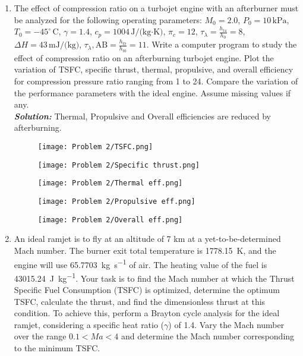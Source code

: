 \documentclass[]{article}
\theoremstyle{definition}
\begin{document}
\begin{enumerate}
\item The effect of compression ratio on a turbojet engine with an afterburner must be analyzed for the following operating parameters:
$ M_0 = 2.0$, $P_0 = 10\, \text{kPa}$, $T_0 = -45^\circ\, \text{C}$, $\gamma = 1.4$, $c_p = 1004\, \text{J/(kg·K)}$, $\pi_c = 12$, $\tau_\lambda = \frac{h_{t4}}{h_0} = 8$, $\Delta H = 43\, \text{mJ/(kg)}$, $\tau_\lambda, \text{AB} = \frac{h_{t7}}{h_{t0}} = 11 $. Write a computer program to study the effect of compression ratio on an afterburning turbojet engine. Plot the variation of TSFC, specific thrust, thermal, propulsive, and overall efficiency for compression pressure ratio ranging from 1 to 24. Compare the variation of the performance parameters with the ideal engine. Assume missing values if any.
\\
\emph{\textbf{Solution:}}
Thermal, Propulsive and Overall efficiencies are reduced by afterburning.
\\
\begin{figure}[htpb]
\texttt{[image: Problem 2/TSFC.png]}
\centering
\end{figure}
\begin{figure}[htpb]
\texttt{[image: Problem 2/Specific thrust.png]}
\centering
\end{figure}
\begin{figure}[htpb]
\texttt{[image: Problem 2/Thermal eff.png]}
\centering
\end{figure}
\begin{figure}[htpb]
\texttt{[image: Problem 2/Propulsive eff.png]}
\centering
\end{figure}
\begin{figure}[htpb]
\texttt{[image: Problem 2/Overall eff.png]}
\centering
\end{figure}

\item 
An ideal ramjet is to fly at an altitude of 7 km at a yet-to-be-determined Mach number. The burner exit total temperature is \SI{1778.15}{\kelvin}, and the engine will use \SI{65.7703}{\kilogram\per\second} of air. The heating value of the fuel is \SI{43015.24}{\joule\per\kilogram}. Your task is to find the Mach number at which the Thrust Specific Fuel Consumption (TSFC) is optimized, determine the optimum TSFC, calculate the thrust, and find the dimensionless thrust at this condition. To achieve this, perform a Brayton cycle analysis for the ideal ramjet, considering a specific heat ratio (\(\gamma\)) of 1.4. Vary the Mach number over the range \(0.1 < Ma < 4\) and determine the Mach number corresponding to the minimum TSFC.


\end{enumerate}
\end{document}
